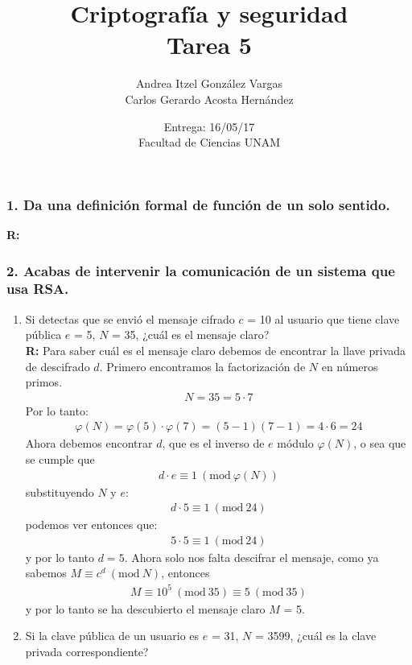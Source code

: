 \documentclass[14pt]{article}
\title{Criptografía y seguridad \\ Tarea 5}
\author{Andrea Itzel González Vargas \\ Carlos Gerardo Acosta Hernández}
\date{Entrega: 16/05/17 \\ Facultad de Ciencias UNAM}
\newcommand{\Mod}[1]{\ (\mathrm{mod}\ #1)}
\begin{document}
\maketitle

\subsubsection*{1. Da una definición formal de función de un solo sentido.}
\textbf{R:} 

\subsubsection*{2. Acabas de intervenir la comunicación de un sistema que usa RSA.}
\begin{enumerate}[label=\alph*)]
\item Si detectas que se envió el mensaje cifrado $c$ = 10 al usuario que tiene clave pública $e$ = 5, $N$ = 35, ¿cuál es el mensaje claro? \\

  \textbf{R:} Para saber cuál es el mensaje claro debemos de encontrar la llave privada de descifrado $d$. Primero encontramos la factorización de $N$ en números primos.
  \begin{gather*}
    N = 35 = 5 \cdot 7
  \end{gather*}
  Por lo tanto:
  \begin{gather*}
    \varphi(N) = \varphi(5) \cdot \varphi(7) = (5 - 1) (7 - 1) = 4 \cdot 6 = 24
  \end{gather*}
  Ahora debemos encontrar $d$, que es el inverso de $e$ módulo $\varphi(N)$, o sea que se cumple que
  \begin{gather*}
    d \cdot e \equiv 1 \Mod{\varphi(N)}
  \end{gather*}
  substituyendo $N$ y $e$:
  \begin{gather*}
    d \cdot 5 \equiv 1 \Mod{24}
  \end{gather*}
  podemos ver entonces que:
  \begin{gather*}
    5 \cdot 5 \equiv 1 \Mod{24}
  \end{gather*}
  y por lo tanto $d = 5$. Ahora solo nos falta descifrar el mensaje, como ya sabemos $M \equiv c^d \Mod{N}$, entonces
  \begin{gather*}
    M \equiv 10^5 \Mod{35} \equiv 5 \Mod{35}
  \end{gather*}
  y por lo tanto se ha descubierto el mensaje claro $M$ = 5.
  
 \item Si la clave pública de un usuario es $e$ = 31, $N$ = 3599, ¿cuál es la clave privada correspondiente? \\
   

\end{enumerate}
\end{document}
